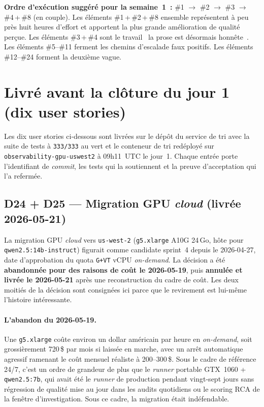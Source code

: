 \documentclass[11pt,a4paper,oneside]{report}
\begin{document}
\noindent
\textbf{Ordre d'exécution suggéré pour la semaine~1~:}
\#1 $\to$ \#2 $\to$ \#3 $\to$ \#4\,+\,\#8 (en couple). Les
éléments \#1\,+\,\#2\,+\,\#8 ensemble représentent à peu près huit
heures d'effort et apportent la plus grande amélioration de qualité
perçue. Les éléments \#3\,+\,\#4 sont le travail \og~la prose est
désormais honnête~\fg{}. Les éléments \#5--\#11 ferment les chemins
d'escalade faux positifs. Les éléments \#12--\#24 forment la
deuxième vague.

\section{Livré avant la clôture du jour 1 (dix user stories)}

Les dix user stories ci-dessous sont livrées sur le dépôt du
service de tri avec la suite de tests à \texttt{333/333} au vert et
le conteneur de tri redéployé sur
\texttt{observability-gpu-uswest2} à 09h11~UTC le jour~1. Chaque
entrée porte l'identifiant de \emph{commit}, les tests qui la
soutiennent et la preuve d'acceptation qui l'a refermée.

\subsection{D24 + D25 --- Migration GPU \emph{cloud} (livrée 2026-05-21)}
\label{sec:gpu-shipped}

La migration GPU \emph{cloud} vers \texttt{us-west-2}
(\texttt{g5.xlarge} A10G 24\,Go, hôte pour
\texttt{qwen2.5:14b-instruct}) figurait comme candidate sprint~4
depuis le 2026-04-27, date d'approbation du quota
\texttt{G+VT} vCPU \emph{on-demand}. La décision a été
\textbf{abandonnée pour des raisons de coût le 2026-05-19}, puis
\textbf{annulée et livrée le 2026-05-21} après une reconstruction
du cadre de coût. Les deux moitiés de la décision sont consignées
ici parce que le revirement est lui-même l'histoire intéressante.

\paragraph{L'abandon du 2026-05-19.}
Une \texttt{g5.xlarge} coûte environ un dollar américain par heure
en \emph{on-demand}, soit grossièrement 720\,\$ par mois si laissée
en marche, avec un arrêt automatique agressif ramenant le coût
mensuel réaliste à 200--300\,\$. Sous le cadre de référence
24/7, c'est un ordre de grandeur de plus que le \emph{runner}
portable GTX~1060 + \texttt{qwen2.5:7b}, qui avait été le
\emph{runner} de production pendant vingt-sept jours sans
régression de qualité mise au jour dans les audits quotidiens ou
le scoring RCA de la fenêtre d'investigation. Sous ce cadre, la
migration était indéfendable.
\end{document}
